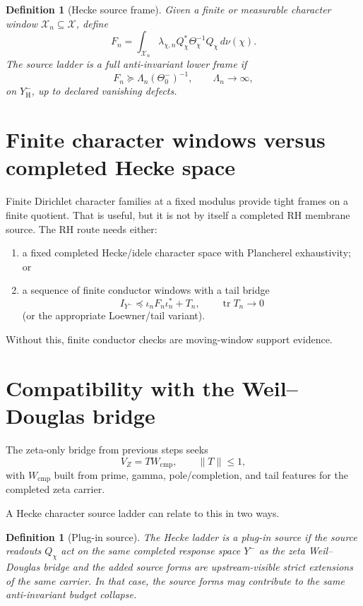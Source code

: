 \documentclass[11pt]{article}
\newtheorem{definition}[theorem]{Definition}
\begin{document}
\begin{definition}[Hecke source frame]
Given a finite or measurable character window $\mathcal X_n\subseteq\mathcal X$, define
\[
 F_n=\int_{\mathcal X_n}\lambda_{\chi,n} Q_\chi^*\Theta_\chi^{-1}Q_\chi\,d\nu(\chi).
\]
The source ladder is a full anti-invariant lower frame if
\[
 F_n\succeq \Lambda_n(\Theta_0^-)^{-1},\qquad \Lambda_n\to\infty,
\]
on $Y^-_{\mathrm H}$, up to declared vanishing defects.
\end{definition}

\section{Finite character windows versus completed Hecke space}
Finite Dirichlet character families at a fixed modulus provide tight frames on a finite quotient. That is useful, but it is not by itself a completed RH membrane source. The RH route needs either:
\begin{enumerate}[label=(\alph*)]
\item a fixed completed Hecke/idele character space with Plancherel exhaustivity; or
\item a sequence of finite conductor windows with a tail bridge
\[
 I_{Y^-}\preceq \iota_n F_n \iota_n^* + T_n,
 \qquad \operatorname{tr}T_n\to0
\]
(or the appropriate Loewner/tail variant).
\end{enumerate}
Without this, finite conductor checks are moving-window support evidence.

\section{Compatibility with the Weil--Douglas bridge}
The zeta-only bridge from previous steps seeks
\[
  V_Z=T W_{\mathrm{cmp}},\qquad \|T\|\le1,
\]
with $W_{\mathrm{cmp}}$ built from prime, gamma, pole/completion, and tail features for the completed zeta carrier.

A Hecke character source ladder can relate to this in two ways.

\begin{definition}[Plug-in source]
The Hecke ladder is a plug-in source if the source readouts $Q_\chi$ act on the same completed response space $Y^-$ as the zeta Weil--Douglas bridge and the added source forms are upstream-visible strict extensions of the same carrier. In that case, the source forms may contribute to the same anti-invariant budget collapse.
\end{definition}
\end{document}
